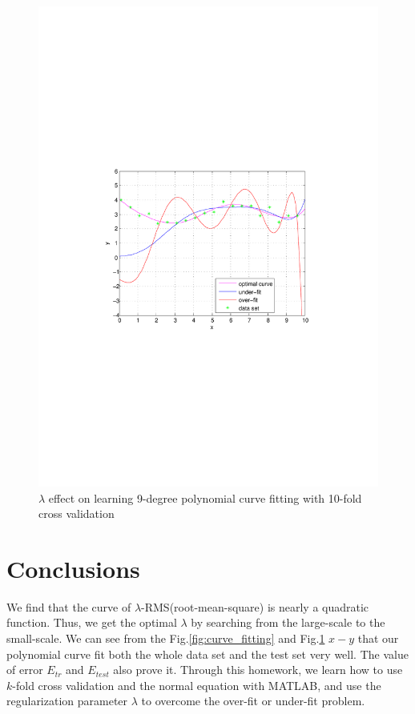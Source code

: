 \documentclass[letterpaper,12pt]{article}
\numberwithin{equation}{section}
\begin{document}
\begin{figure}[H]
\vspace{-8.5cm}
 
\centering
      \includegraphics[scale=0.8]{untitled}
\vspace{-8.3cm}
\caption{\label{fig:over_fit} 
$\lambda$ effect on learning 9-degree polynomial curve fitting with 10-fold cross validation}
\end{figure}

\section{Conclusions}
We find that the curve of $\lambda$-RMS(root-mean-square) is nearly a quadratic function. Thus, we get the optimal $\lambda$ by searching from the large-scale to the small-scale. We can see from the Fig.\ref{fig:curve_fitting} and Fig.\ref{fig:over_fit} $x-y$ that our polynomial curve fit both the whole data set and the test set very well. The value of error $E_{tr}$ and $E_{test}$ also prove it. Through this homework, we learn how to use $k$-fold cross validation and the normal equation with MATLAB, and use the regularization parameter $\lambda$ to overcome the over-fit or under-fit problem.
\end{document}
